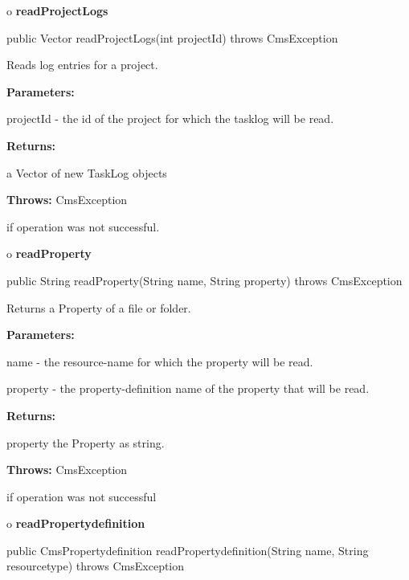 o {\bf readProjectLogs} 

\begin{PRE}
 public Vector readProjectLogs(int projectId) throws CmsException
\end{PRE}

\begin{description}
\htmlDD Reads log entries for a project. 

\begin{description}
\item {\bf Parameters:}  

projectId - the id of the project for which the tasklog will be read.  
\item {\bf Returns:}  

a Vector of new TaskLog objects  
\item {\bf Throws:} CmsException  

if operation was not successful.  
\end{description}

\end{description}

o {\bf readProperty} 

\begin{PRE}
 public String readProperty(String name,
                            String property) throws CmsException
\end{PRE}

\begin{description}
\htmlDD Returns a Property of a file or folder. 

\begin{description}
\item {\bf Parameters:}  

name - the resource-name for which the property will be read.  

property - the property-definition name of the property that will be read.  
\item {\bf Returns:}  

property the Property as string.  
\item {\bf Throws:} CmsException  

if operation was not successful  
\end{description}

\end{description}

o {\bf readPropertydefinition} 

\begin{PRE}
 public CmsPropertydefinition readPropertydefinition(String name,
                                                     String resourcetype) throws CmsException
\end{PRE}

